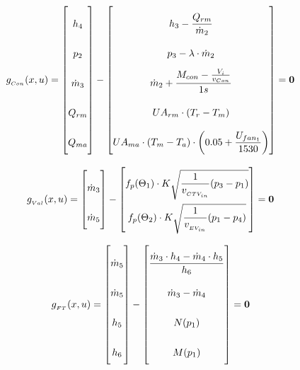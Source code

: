 \begin{equation} \label{eq:Gcondenser}\renewcommand{\arraystretch}{2.5}
	g_{_{Con}}(x,u) =  \begin{bmatrix}
		h_{4}				\\ %
		p_{2}				\\ %
		\dot{m}_{3}			\\ %
		Q_{rm}				\\
		Q_{ma}				\\
	\end{bmatrix}
	-
	\begin{bmatrix}
		h_{3} - \dfrac{Q_{rm}}{\dot{m}_{2}}	\\											%
		p_{3} - \lambda \cdot \dot{m}_{2}			\\									%
		\dot{m}_{2} + \dfrac{M_{con} - \frac{V_i}{v_{Con}}}{1s}	\\						%
		U A_{rm} \cdot (T_r - T_m) \\
		U A_{ma} \cdot (T_m - T_a)\cdot \left(0.05 + \dfrac{U_{fan_1}}{1530}\right) \\
	\end{bmatrix}
	=\textbf{0}
\end{equation}




\begin{equation} \label{eq:Gvalves}\renewcommand{\arraystretch}{2.5}
	g_{_{Val}}(x,u) =  \begin{bmatrix}
		\dot{m}_{3}			\\ %

		\dot{m}_{5}			\\ %
	\end{bmatrix}
	-
	\begin{bmatrix}
		f_p(\Theta_1) \cdot K  \sqrt{\dfrac{1}{v_{_{CTV_{in}}}} (p_{3} - p_{1})}\\		%
		f_p(\Theta_2) \cdot K  \sqrt{\dfrac{1}{v_{_{EV_{in}}}} (p_{1} - p_{4})}\\			%
	\end{bmatrix}
	=\textbf{0}
\end{equation}

\begin{equation} \label{eq:Gflashtank}\renewcommand{\arraystretch}{2.5}
	g_{_{FT}}(x,u) =  \begin{bmatrix}
		\dot{m}_{5}			\\
		\dot{m}_{5}				\\
		h_{5}  \\
		h_{6} \\
	\end{bmatrix}
	-
	\begin{bmatrix}
		\dfrac{\dot{m}_{3} \cdot h_4 - \dot{m}_{4} \cdot h_5}{h_6}					\\
		\dot{m}_{3} - \dot{m}_{4}					\\
		N(p_1)\\
		M(p_1)\\
	\end{bmatrix}
	=\textbf{0}
\end{equation}



